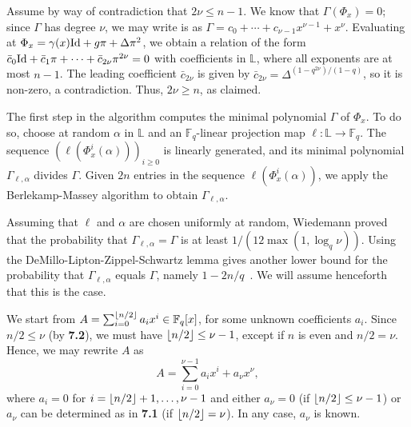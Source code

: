 \documentclass[sigconf]{acmart}
\newcommand{\F}{\mathbb{F}}
\renewcommand{\L}{\mathbb{L}}
\DeclarePairedDelimiter\floor{\lfloor}{\rfloor}
\begin{document}
Assume by way of contradiction that $2\nu \le n-1$.  We know that
$\Gamma(\Phi_x) = 0$; since $\Gamma$ has degree $\nu$, we may write
is as $\Gamma = c_0 + \cdots + c_{\nu-1} x^{\nu-1} +
x^\nu$. Evaluating at $\Phi_x = \gamma(x) {\rm Id} + g \pi + \Delta
\pi^2$, we obtain a relation of the form $\bar c_0 {\rm Id} + \bar
c_1 \pi + \cdots + \bar c_{2\nu} \pi^{2\nu} = 0$ with
coefficients in $\L$, where all exponents are at most $n-1$. The
leading coefficient $\bar c_{2\nu}$ is given by $\bar c_{2\nu} =
\Delta^{(1-q^{2\nu})/(1-q)}$, so it is non-zero, a contradiction.
Thus, $2\nu \ge n$, as claimed.

\smallskip{} The first step in the algorithm computes
the minimal polynomial $\Gamma$ of $\Phi_x$. 
To do so, choose at random $\alpha$ in $\L$ and an $\F_q$-linear
projection map  $\ell: \L \to \F_q$. The sequence
$(\ell(\Phi_x^i(\alpha)))_{i \ge 0}$ is linearly generated, and its
minimal polynomial $\Gamma_{\ell,\alpha}$ divides $\Gamma$. Given $2n$
entries in the sequence $\ell(\Phi_x^i(\alpha))$, we apply the
Berlekamp-Massey algorithm to obtain $\Gamma_{\ell,\alpha}$.

Assuming that $\ell$ and $\alpha$ are chosen uniformly at random,
Wiedemann proved~\cite{Wiedemann:1986:SSL:13738.13744} that the
probability that $\Gamma_{\ell,\alpha}=\Gamma$ is at least $1/(12
\max(1, \log_q \nu))$. Using the DeMillo-Lipton-Zippel-Schwartz lemma
gives another lower bound for the probability that
$\Gamma_{\ell,\alpha}$ equals $\Gamma$, namely
$1-2n/q$~\cite{Kaltofen:1991:PEP:113379.113396,Kaltofen-saun:1991:WMS:646027.676885}. We
will assume henceforth that this is the case.

\smallskip{}
We start from $A = \sum_{i = 0}^{\floor*{n/2}}a_ix^i \in \F_q[x]$, for
some unknown coefficients $a_i$. Since $n/2 \le \nu$ (by {\bf 7.2}), we must have 
$\floor*{n/2} \le \nu -1$, except if $n$ is even and $n/2 = \nu$.
Hence, we may rewrite $A$ as 
$$A = \sum_{i = 0}^{\nu - 1}a_ix^i + a_{\nu}x^{\nu},$$ where $a_i = 0$
for $i=\floor*{n/2}+1,\dots,\nu-1$ and either $a_\nu=0$ (if
$\floor*{n/2} \le \nu -1$) or $a_\nu$ can be determined as in {\bf
  7.1} (if $\floor*{n/2} = \nu$). In any case, $a_\nu$ is known.
\end{document}
